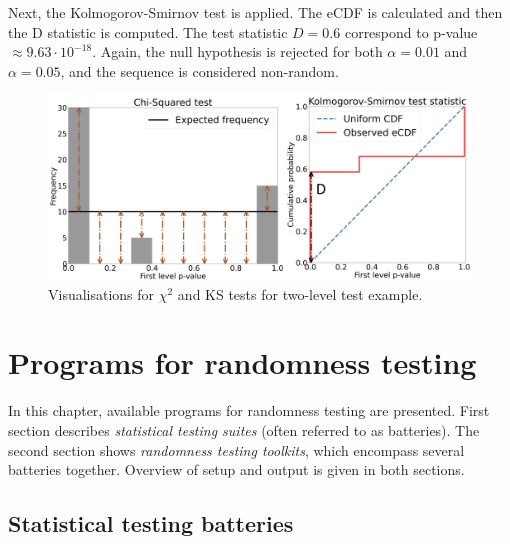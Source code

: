 \documentclass[
  digital,     %
  oneside,     %
  nosansbold,  %
  nocolorbold, %
  nolof,         %
  nolot,         %
]{fithesis4}
\begin{document}
Next, the Kolmogorov-Smirnov test is applied. The eCDF is calculated and then the D statistic is computed. The test statistic $D = 0.6$ correspond to p-value $\approx 9.63\cdot10^{-18}$. Again, the null hypothesis is rejected for both $\alpha = 0.01$ and $\alpha = 0.05$, and the sequence is considered non-random.

\begin{figure}[h]
  \begin{center}
    \includegraphics[width=12.5cm]{figures/two_example.png}
  \end{center}
  \caption{Visualisations for $\chi^2$ and KS tests for two-level test example.}
  \label{fig:two_example}
\end{figure}


\chapter{Programs for randomness testing} \label{chap:sols}
In this chapter, available programs for randomness testing are presented. First section describes \emph{statistical testing suites} (often referred to as batteries). The second section shows \emph{randomness testing toolkits}, which encompass several batteries together. Overview of setup and output is given in both sections.

\section{Statistical testing batteries} \label{chap:sols-batteries}
\end{document}
